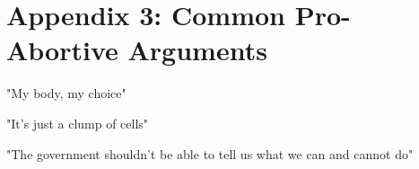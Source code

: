 \chapter{Appendix 3: Common Pro-Abortive Arguments}

"My body, my choice"

"It's just a clump of cells"

"The government shouldn't be able to tell us what we can and cannot do"

